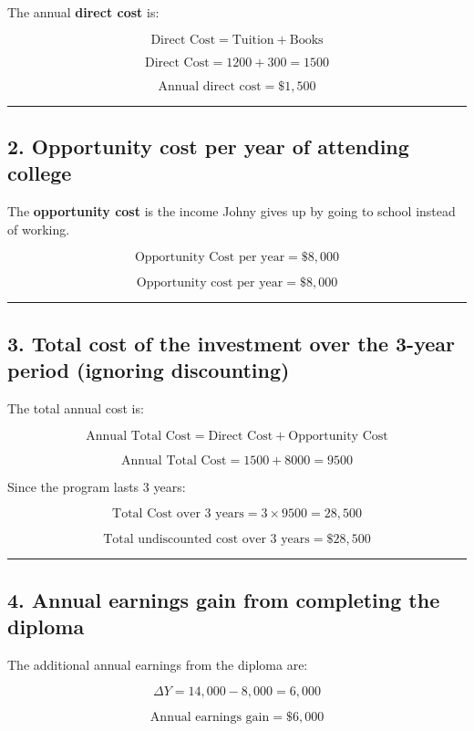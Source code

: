 \documentclass[12pt]{article}
\begin{document}
The annual \textbf{direct cost} is:

\[
\text{Direct Cost} = \text{Tuition} + \text{Books}
\]

\[
\text{Direct Cost} = 1200 + 300 = 1500
\]

\[
\boxed{\text{Annual direct cost} = \$1{,}500}
\]

\hrule
\vspace{0.5em}

\subsection*{2. Opportunity cost per year of attending college}

The \textbf{opportunity cost} is the income Johny gives up by going to school instead of working.

\[
\text{Opportunity Cost per year} = \$8{,}000
\]

\[
\boxed{\text{Opportunity cost per year} = \$8{,}000}
\]

\hrule
\vspace{0.5em}

\subsection*{3. Total cost of the investment over the 3-year period (ignoring discounting)}

The total annual cost is:

\[
\text{Annual Total Cost} = \text{Direct Cost} + \text{Opportunity Cost}
\]

\[
\text{Annual Total Cost} = 1500 + 8000 = 9500
\]

Since the program lasts 3 years:

\[
\text{Total Cost over 3 years} = 3 \times 9500 = 28{,}500
\]

\[
\boxed{\text{Total undiscounted cost over 3 years} = \$28{,}500}
\]

\hrule
\vspace{0.5em}

\subsection*{4. Annual earnings gain from completing the diploma}

The additional annual earnings from the diploma are:

\[
\Delta Y = 14{,}000 - 8{,}000 = 6{,}000
\]

\[
\boxed{\text{Annual earnings gain} = \$6{,}000}
\]
\end{document}
